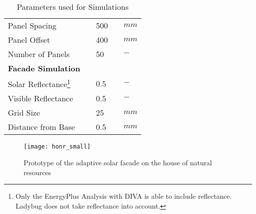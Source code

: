 \begin{table}[h!]
\begin{center}
\begin{tabular}{lllll}
		    Panel Spacing          		&& 500     		&& $mm$    \\
		    Panel Offset          		&& 400     		&& $mm$    \\
		    Number of Panels          	&& 50     		&& $-$    \\\hline
		    \bf Facade Simulation 		&& ~     		&& ~    \\ \hline
		    Solar Reflectance\footnote{\label{reflectance}Only the EnergyPlus Analysis with DIVA is able to include reflectance. Ladybug does not take reflectance into account.}      									&& 0.5     		&& $-$    \\
		    Visible Reflectance\footnotemark[1]
		    				    		&& 0.5     		&& $-$    \\
		    Grid Size      	    		&& 25     		&& $mm$    \\
		    Distance from Base\footnotemark[2]
		    				     		&& 0.5     		&& $mm$    \\
		    \end{tabular}
		    \end{center}
		    \caption{Parameters used for Simulations}
		\end{table}








		\begin{figure}[h] %
			\begin{center}
			\texttt{[image: honr\_small]}
			\caption{Prototype of the adaptive solar facade on the house of natural resources}
			\label{fig:honr}
			\end{center} 
		\end{figure}
